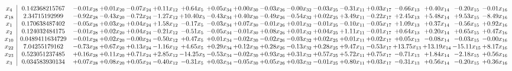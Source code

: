 \documentclass[9pt]{article}
\begin{document}
 \[\begin{array}{c| c c@{\hskip 2pt} c@{\hskip 2pt} c@{\hskip 2pt} c@{\hskip 2pt} c@{\hskip 2pt} c@{\hskip 2pt} c@{\hskip 2pt} c@{\hskip 2pt} c@{\hskip 2pt} c@{\hskip 2pt} c@{\hskip 2pt} c@{\hskip 2pt} c@{\hskip 2pt} c@{\hskip 2pt} c@{\hskip 2pt} c@{\hskip 2pt} }
 x_{4}   &  0.142368215767 & -0.01 x_{28} & +  0.01 x_{20} & -0.07 x_{24} & +  0.11 x_{12} & +  0.64 x_{5} & +  0.05 x_{34} & +  0.00 x_{30} & -0.03 x_{26} & -0.00 x_{32} & -0.03 x_{25} & -0.31 x_{11} & +  0.03 x_{17} & -0.66 x_{13} & +  0.40 x_{14} & -0.20 x_{15} & -0.01 x_{16}\\
 x_{18}   &  2.34715192999 & -0.92 x_{28} & -0.43 x_{20} & -0.72 x_{24} & -1.27 x_{12} & + 10.40 x_{5} & -0.43 x_{34} & +  0.40 x_{30} & -0.49 x_{26} & -0.54 x_{32} & +  0.02 x_{25} & +  3.49 x_{11} & -0.22 x_{17} & +  2.45 x_{13} & +  5.48 x_{14} & +  9.53 x_{15} & -8.49 x_{16}\\
 x_{1}   &  0.170638487402 & -0.05 x_{28} & +  0.03 x_{20} & +  0.04 x_{24} & +  1.58 x_{12} & -0.17 x_{5} & -0.03 x_{34} & +  0.07 x_{30} & -0.01 x_{26} & +  0.01 x_{32} & -0.01 x_{25} & -0.10 x_{11} & -0.05 x_{17} & +  1.09 x_{13} & +  0.37 x_{14} & -0.56 x_{15} & +  0.92 x_{16}\\
 x_{2}   &  0.124032484175 & -0.01 x_{28} & +  0.02 x_{20} & +  0.04 x_{24} & -0.21 x_{12} & -0.51 x_{5} & -0.05 x_{34} & -0.01 x_{30} & +  0.08 x_{26} & +  0.01 x_{32} & +  0.04 x_{25} & +  1.11 x_{11} & -0.01 x_{17} & +  0.64 x_{13} & +  0.20 x_{14} & +  0.65 x_{15} & +  0.47 x_{16}\\
 x_{10}   &  0.0489411634729 & -0.01 x_{28} & +  0.02 x_{20} & -0.00 x_{24} & -0.50 x_{12} & +  0.47 x_{5} & +  0.01 x_{34} & -0.02 x_{30} & -0.02 x_{26} & -0.03 x_{32} & +  0.02 x_{25} & +  0.01 x_{11} & +  0.02 x_{17} & +  0.05 x_{13} & -0.08 x_{14} & -0.03 x_{15} & -0.00 x_{16}\\
 x_{22}   &  7.04255179162 & -0.73 x_{28} & +  0.67 x_{20} & +  0.13 x_{24} & -1.16 x_{12} & +  4.65 x_{5} & +  0.29 x_{34} & +  0.12 x_{30} & +  0.28 x_{26} & -0.13 x_{32} & +  0.28 x_{25} & +  9.47 x_{11} & -0.53 x_{17} & + 13.75 x_{13} & + 13.19 x_{14} & -15.11 x_{15} & +  8.17 x_{16}\\
 x_{23}   &  0.523051237485 & +  0.16 x_{28} & +  0.11 x_{20} & +  0.71 x_{24} & +  2.85 x_{12} & -14.25 x_{5} & -0.53 x_{34} & -0.02 x_{30} & +  0.93 x_{26} & +  0.31 x_{32} & +  0.57 x_{25} & +  5.72 x_{11} & +  0.75 x_{17} & -0.71 x_{13} & +  1.84 x_{14} & -2.18 x_{15} & +  0.56 x_{16}\\
 x_{3}   &  0.034583930134 & +  0.07 x_{28} & +  0.08 x_{20} & +  0.05 x_{24} & -0.40 x_{12} & -0.31 x_{5} & +  0.03 x_{34} & -0.05 x_{30} & +  0.05 x_{26} & +  0.03 x_{32} & -0.01 x_{25} & +  0.80 x_{11} & +  0.03 x_{17} & -0.31 x_{13} & +  0.56 x_{14} & -0.20 x_{15} & +  0.36 x_{16}\\

\end{array}\]
\end{document}
